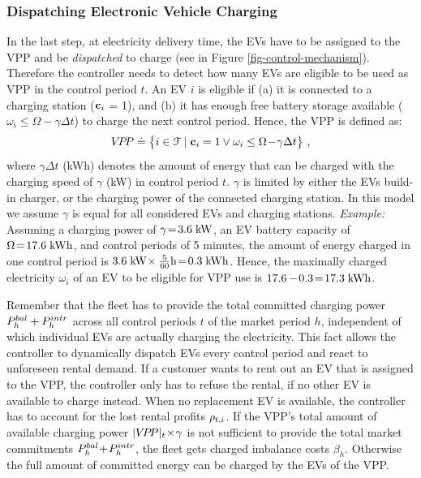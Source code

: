 \documentclass[a4paper, 12pt]{article}
\begin{document}
\subsubsection{Dispatching Electronic Vehicle Charging}
\label{sec:orgc5e9509}
In the last step, at electricity delivery time, the EVs have to be assigned to
the VPP and be \emph{dispatched} to charge (see in Figure
\ref{fig-control-mechanism}). Therefore the controller needs to detect how many
EVs are eligible to be used as VPP in the control period \(t\). An EV \(i\) is
eligible if (a) it is connected to a charging station (\({\bf{c}}_{i}\) = 1), and (b) it has
enough free battery storage available
(\(\omega_{i}\leq\Omega\!-\!\gamma\Delta{t}\)) to charge the next control
period. Hence, the VPP is defined as:
\begin{equation}
    V\!P\!P \doteq \big\{i\in{\cal{F}} \;|\; {\bf{c}}_{i} = 1 \vee \omega_{i}\leq\Omega\!-\!\gamma\Delta{t}\big\} \text{ ,}
\end{equation}
where \(\gamma\Delta{t}\) (kWh) denotes the amount of energy that can be charged
with the charging speed of \(\gamma\) (kW) in control period \(t\). \(\gamma\) is
limited by either the EVs build-in charger, or the charging power of the
connected charging station. In this model we assume \(\gamma\) is equal for all
considered EVs and charging stations. \emph{Example:} Assuming a charging power of
\(\gamma\!=\!3.6\;\text{kW}\), an EV battery capacity of \(\Omega\!=\!17.6\;\text{kWh}\), and
control periods of 5 minutes, the amount of energy charged in one control period
is \(3.6\;\text{kW}\!\times\frac{5}{60}\text{h}\!=\!0.3\;\text{kWh}\). Hence, the maximally
charged electricity \(\omega_{i}\) of an EV to be eligible for VPP use is
\(17.6-\!0.3\!=\!17.3\;\text{kWh}\).

Remember that the fleet has to provide the total committed charging power
\(P^{bal}_{h}+P^{intr}_{h}\) across all control periods \(t\) of the market period \(h\),
independent of which individual EVs are actually charging the electricity. This
fact allows the controller to dynamically dispatch EVs every control period and
react to unforeseen rental demand. If a customer wants to rent out an EV that is
assigned to the VPP, the controller only has to refuse the rental, if no other
EV is available to charge instead. When no replacement EV is available, the
controller has to account for the lost rental profits \(\rho_{t,i}\). If the VPP's total
amount of available charging power \(|{V\!P\!P}|_{t}\!\times\!\gamma\) is not sufficient
to provide the total market commitments \(P^{bal}_{h}\!+\!P^{intr}_{h}\), the fleet gets
charged imbalance costs \(\beta_{h}\). Otherwise the full amount of committed
energy can be charged by the EVs of the VPP.
\end{document}

